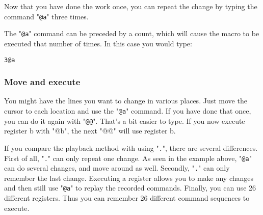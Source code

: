 \begin{center}\end{center}

Now that you have done the work once, you can repeat the change by typing the command "\texttt{@a}" three times.

The "\texttt{@a}" command can be preceded by a count, which will cause the macro to be executed that number of times.
In this case you would type:

\begin{Verbatim}[samepage=true]
 3@a
\end{Verbatim}

\subsubsection{Move and execute}
You might have the lines you want to change in various places.
Just move the cursor to each location and use the "\texttt{@a}" command.
If you have done that once, you can do it again with "\texttt{@@}".
That's a bit easier to type.
If you now execute register b with "@b", the next "@@" will use register b.

If you compare the playback method with using "\texttt{.}", there are several differences.
First of all, "\texttt{.}" can only repeat one change.
As seen in the example above, "\texttt{@a}" can do several changes, and move around as well.
Secondly, "\texttt{.}" can only remember the last change.
Executing a register allows you to make any changes and then still use "\texttt{@a}" to replay the recorded commands.
Finally, you can use 26 different registers.
Thus you can remember 26 different command sequences to execute.


